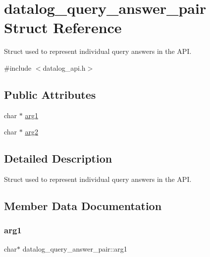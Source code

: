 \hypertarget{structdatalog__query__answer__pair}{}\section{datalog\+\_\+query\+\_\+answer\+\_\+pair Struct Reference}
\label{structdatalog__query__answer__pair}


Struct used to represent individual query answers in the A\+PI.  




{\ttfamily \#include $<$datalog\+\_\+api.\+h$>$}

\subsection*{Public Attributes}
\begin{DoxyCompactItemize}
\item 
char $\ast$ \hyperlink{structdatalog__query__answer__pair_a67d3e57710c1e35b53c6835658be78ef}{arg1}
\item 
char $\ast$ \hyperlink{structdatalog__query__answer__pair_a10bde40ebdb18cef34e13cb413a92de1}{arg2}
\end{DoxyCompactItemize}


\subsection{Detailed Description}
Struct used to represent individual query answers in the A\+PI. 

\subsection{Member Data Documentation}
\mbox{\label{structdatalog__query__answer__pair_a67d3e57710c1e35b53c6835658be78ef}} 
\subsubsection{\texorpdfstring{arg1}{arg1}}
{\footnotesize\ttfamily char$\ast$ datalog\+\_\+query\+\_\+answer\+\_\+pair\+::arg1}

\mbox{\label{structdatalog__query__answer__pair_a10bde40ebdb18cef34e13cb413a92de1}} 
